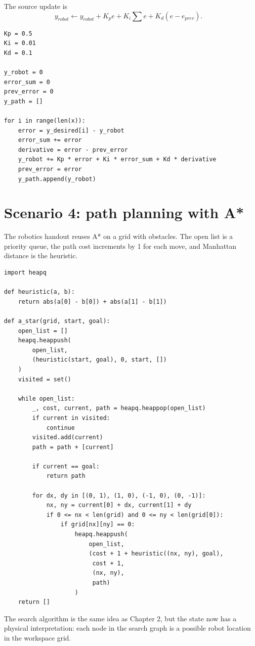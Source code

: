 The source update is
\[
y_{robot}\leftarrow y_{robot}+K_p e+K_i\sum e+K_d(e-e_{prev}).
\]

\begin{lstlisting}[style=mlpython]
Kp = 0.5
Ki = 0.01
Kd = 0.1

y_robot = 0
error_sum = 0
prev_error = 0
y_path = []

for i in range(len(x)):
    error = y_desired[i] - y_robot
    error_sum += error
    derivative = error - prev_error
    y_robot += Kp * error + Ki * error_sum + Kd * derivative
    prev_error = error
    y_path.append(y_robot)
\end{lstlisting}

\section{Scenario 4: path planning with A*}

The robotics handout reuses A* on a grid with obstacles. The open list is a priority queue, the path cost increments by 1 for each move, and Manhattan distance is the heuristic.

\begin{lstlisting}[style=mlpython]
import heapq

def heuristic(a, b):
    return abs(a[0] - b[0]) + abs(a[1] - b[1])

def a_star(grid, start, goal):
    open_list = []
    heapq.heappush(
        open_list,
        (heuristic(start, goal), 0, start, [])
    )
    visited = set()

    while open_list:
        _, cost, current, path = heapq.heappop(open_list)
        if current in visited:
            continue
        visited.add(current)
        path = path + [current]

        if current == goal:
            return path

        for dx, dy in [(0, 1), (1, 0), (-1, 0), (0, -1)]:
            nx, ny = current[0] + dx, current[1] + dy
            if 0 <= nx < len(grid) and 0 <= ny < len(grid[0]):
                if grid[nx][ny] == 0:
                    heapq.heappush(
                        open_list,
                        (cost + 1 + heuristic((nx, ny), goal),
                         cost + 1,
                         (nx, ny),
                         path)
                    )
    return []
\end{lstlisting}

\begin{intuition}
The search algorithm is the same idea as Chapter 2, but the state now has a physical interpretation: each node in the search graph is a possible robot location in the workspace grid.
\end{intuition}

